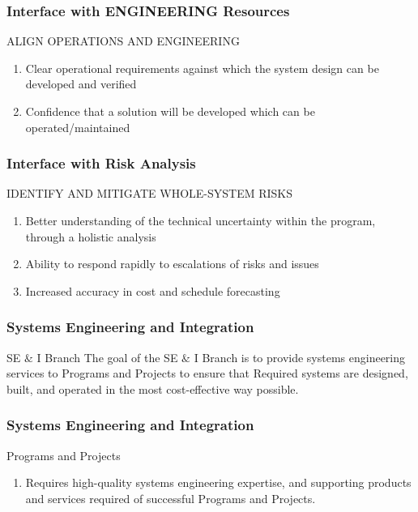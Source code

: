 \begin{frame}
\frametitle{Interface with ENGINEERING Resources }
\begin{block}{ALIGN OPERATIONS AND ENGINEERING}

\begin{enumerate}
    \item Clear operational requirements against which the system design can be developed and verified
   \item Confidence that a solution will be developed which can be operated/maintained
\end{enumerate}

\end{block}
\end{frame}

\begin{frame}
\frametitle{Interface with Risk Analysis }
\begin{block}{IDENTIFY AND MITIGATE WHOLE-SYSTEM RISKS}

\begin{enumerate}
    \item  Better understanding of the technical uncertainty within the program, through a holistic analysis
   \item  Ability to respond rapidly to escalations of risks and issues
    \item Increased accuracy in cost and schedule forecasting
\end{enumerate}

\end{block}
\end{frame}


\begin{frame}
\frametitle{Systems Engineering and Integration}
\begin{block}{SE $\& $ I Branch   }
 The goal of the SE $\& $ I Branch is to provide systems engineering services to Programs and Projects to ensure that Required systems are designed, built, and operated in the most cost-effective way possible. 
\end{block}
\end{frame}


\begin{frame}
\frametitle{Systems Engineering and Integration}
\begin{block}{Programs and Projects  }

\begin{enumerate}
    \item  Requires high-quality systems engineering expertise, and supporting products and services required of successful Programs and Projects.
 \end{enumerate}

\end{block}
\end{frame}



